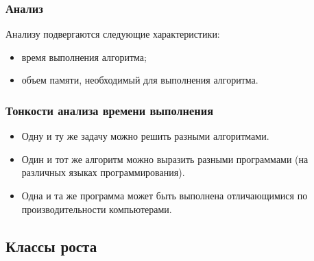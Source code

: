 \begin{frame}
    \frametitle{Анализ}
    
    Анализу подвергаются следующие характеристики:
    \begin{itemize}
        \item \alert{время} выполнения алгоритма;
        \item \alert{объем памяти}, необходимый для выполнения алгоритма.
    \end{itemize}
\end{frame}

\begin{frame}
    \frametitle{Тонкости анализа времени выполнения}
    
    \begin{itemize}
        \item Одну и ту же \alert{задачу} можно решить разными \alert{алгоритмами}. 
        \item Один и тот же \alert{алгоритм} можно выразить разными \alert{программами} (на различных языках программирования).
        \item Одна и та же \alert{программа} может быть выполнена отличающимися по производительности \alert{компьютерами}.
    \end{itemize}
\end{frame}


\subsection{Классы роста}


